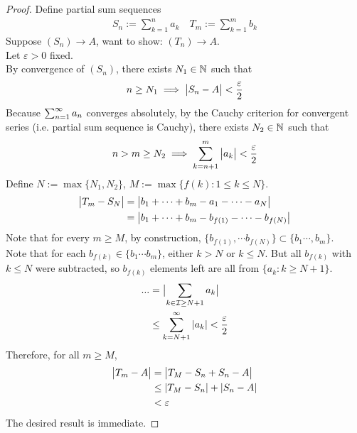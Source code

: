 \documentclass[11pt]{article}
\begin{document}
	\begin{proof}
		Define partial sum sequences
		\begin{align}
			S_n := \sum_{k=1}^n a_k \quad
			T_m := \sum_{k=1}^m b_k
		\end{align}
		Suppose $(S_n) \to A$, want to show: $(T_n) \to A$.\\
		Let $\varepsilon > 0$ fixed. \\
		By convergence of $(S_n)$, there exists $N_1 \in \mathbb{N}$ such that
		\begin{align}
			n \geq N_1 \implies \big \vert {S_n - A} \big \vert < \frac{\varepsilon}{2}
		\end{align}
		Because $\sum_{{n}=1}^\infty {a}_{n}$ converges absolutely, by the Cauchy criterion for convergent series (i.e. partial sum sequence is Cauchy), there exists $N_2 \in \mathbb{N}$ such that
		\begin{align}
			n > m \geq N_2 \implies \sum_{k=n+1}^m \big \vert {a_k} \big \vert < \frac{\varepsilon}{2}
		\end{align}
		Define $N := \max\{N_1, N_2\}$, $M := \max\{f(k): 1 \leq k \leq N\}$.
		\begin{align}
			\big \vert {T_m - S_N} \big \vert &= \big \vert {b_1 + \cdots + b_m - a_1 - \cdots - a_N} \big \vert \\
			&= \big \vert {b_1 + \cdots + b_m	 - b_{f(1)} - \cdots - b_{f(N)}} \big \vert
		\end{align}
		Note that for every $m \geq M$,
		by construction, $\{b_{f(1)}, \cdots b_{f(N)}\} \subset \{b_1 \cdots, b_m\}$. \\
		Note that for each $b_{f(k)} \in \{b_1 \cdots b_m\}$, either $k > N$ or $k \leq N$. But all $b_{f(k)}$ with $k \leq N$ were subtracted, so $b_{f(k)}$ elements left are all from $\{a_k: k \geq N+1\}$.
		\begin{align}
			... &= \big \vert {\sum_{k \in \mathcal{{I}} \geq N + 1} a_k} \big \vert \\
			&\leq \sum_{k=N+1}^\infty |a_k| < \frac{\varepsilon}{2}
		\end{align}
		Therefore, for all $m \geq M$, 
		\begin{align}
			\big \vert {T_m - A} \big \vert &= \big \vert {T_M - S_n + S_n - A} \big \vert \\
			&\leq |T_M - S_n| + |S_n - A| \\
			&< \varepsilon
		\end{align}
		The desired result is immediate.
	\end{proof}
	
\end{document}
